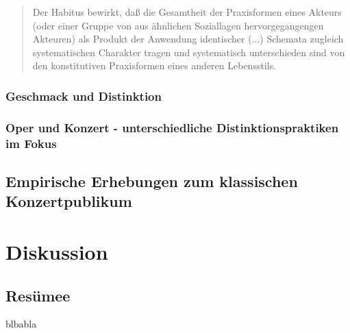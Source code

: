 \documentclass[a4paper, german, oneside]{scrbook}
\begin{document}
\blockquote[{\cite[278]{bourdieu_feinen_2012}}]{Der Habitus bewirkt, daß die Gesamtheit der Praxisformen eines Akteurs (oder einer Gruppe von aus ähnlichen Soziallagen hervorgegangengen Akteuren) als Produkt der Anwendung identischer (...) Schemata zugleich systematischen Charakter tragen und systematisch unterschieden sind von den konstitutiven Praxisformen eines anderen Lebensstils.}

\section{Geschmack und Distinktion}



\section{Oper und Konzert - unterschiedliche Distinktionspraktiken im Fokus}
\label{operUndKonzert}


\chapter{Empirische Erhebungen zum klassischen Konzertpublikum}

\part{Diskussion}



\chapter{Resümee}
blbabla



\printbibliography[filter=LV]
\printbibliography[heading=IQ, filter=IQ]
\end{document}
